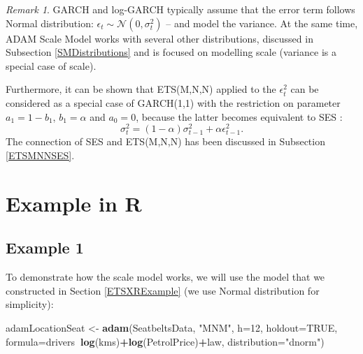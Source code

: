 \documentclass[]{book}
\newenvironment{Shaded}{\begin{snugshade}}{\end{snugshade}}
\newcommand{\DataTypeTok}[1]{\textcolor[rgb]{0.13,0.29,0.53}{#1}}
\newcommand{\DecValTok}[1]{\textcolor[rgb]{0.00,0.00,0.81}{#1}}
\newcommand{\KeywordTok}[1]{\textcolor[rgb]{0.13,0.29,0.53}{\textbf{#1}}}
\newcommand{\NormalTok}[1]{#1}
\newcommand{\OperatorTok}[1]{\textcolor[rgb]{0.81,0.36,0.00}{\textbf{#1}}}
\newcommand{\OtherTok}[1]{\textcolor[rgb]{0.56,0.35,0.01}{#1}}
\newcommand{\StringTok}[1]{\textcolor[rgb]{0.31,0.60,0.02}{#1}}
\theoremstyle{definition}
\theoremstyle{definition}
\theoremstyle{definition}
\theoremstyle{definition}
\theoremstyle{remark}
\newtheorem*{remark}{Remark}
\begin{document}
\begin{remark}
GARCH and log-GARCH typically assume that the error term follows Normal distribution: \(\epsilon_t \sim \mathcal{N}(0, \sigma_t^2)\) -- and model the variance. At the same time, ADAM Scale Model works with several other distributions, discussed in Subsection \ref{SMDistributions} and is focused on modelling scale (variance is a special case of scale).
\end{remark}

Furthermore, it can be shown that ETS(M,N,N) applied to the \(\epsilon_t^2\) can be considered as a special case of GARCH(1,1) with the restriction on parameter \(a_1=1-b_1\), \(b_1= \alpha\) and \(a_0=0\), because the latter becomes equivalent to SES \citep{Geweke1986}:
\begin{equation}
    \sigma_t^2 = (1-\alpha) \sigma_{t-1}^2 + \alpha \epsilon_{t-1}^2 .
    \label{eq:GARCHSES}
\end{equation}
The connection of SES and ETS(M,N,N) has been discussed in Subsection \ref{ETSMNNSES}.

\hypertarget{example-in-r-1}{%
\section{Example in R}\label{example-in-r-1}}

\hypertarget{example-1}{%
\subsection{Example 1}\label{example-1}}

To demonstrate how the scale model works, we will use the model that we constructed in Section \ref{ETSXRExample} (we use Normal distribution for simplicity):

\begin{Shaded}
\begin{Highlighting}[]
\NormalTok{adamLocationSeat <-}\StringTok{ }\KeywordTok{adam}\NormalTok{(SeatbeltsData, }\StringTok{"MNM"}\NormalTok{, }\DataTypeTok{h=}\DecValTok{12}\NormalTok{, }\DataTypeTok{holdout=}\OtherTok{TRUE}\NormalTok{,}
                         \DataTypeTok{formula=}\NormalTok{drivers}\OperatorTok{~}\KeywordTok{log}\NormalTok{(kms)}\OperatorTok{+}\KeywordTok{log}\NormalTok{(PetrolPrice)}\OperatorTok{+}\NormalTok{law,}
                         \DataTypeTok{distribution=}\StringTok{"dnorm"}\NormalTok{)}
\end{Highlighting}
\end{Shaded}
\end{document}
